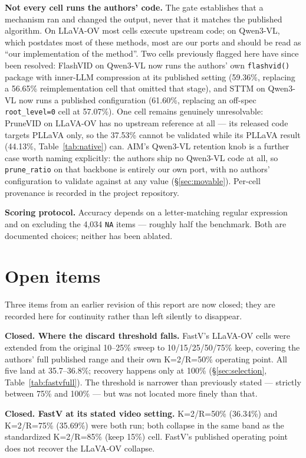 \documentclass[11pt]{article}
\begin{document}
\textbf{Not every cell runs the authors' code.} The gate establishes that a
mechanism ran and changed the output, never that it matches the published
algorithm. On LLaVA-OV most cells execute upstream code; on Qwen3-VL, which
postdates most of these methods, most are our ports and should be read as
``our implementation of the method''. Two cells previously flagged here have
since been resolved: FlashVID on Qwen3-VL now runs the authors' own
\texttt{flashvid()} package with inner-LLM compression at its published
setting (59.36\%, replacing a 56.65\% reimplementation cell that omitted
that stage), and STTM on Qwen3-VL now runs a published configuration
(61.60\%, replacing an off-spec \texttt{root\_level=0} cell at 57.07\%). One
cell remains genuinely unresolvable: PruneVID on LLaVA-OV has no upstream
reference at all --- its released code targets PLLaVA only, so the 37.53\%
cannot be validated while its PLLaVA result (44.13\%, Table~\ref{tab:native})
can. AIM's Qwen3-VL retention knob is a further case worth naming
explicitly: the authors ship no Qwen3-VL code at all, so \texttt{prune\_ratio}
on that backbone is entirely our own port, with no authors' configuration to
validate against at any value (\S\ref{sec:movable}). Per-cell provenance is
recorded in the project repository.

\textbf{Scoring protocol.} Accuracy depends on a letter-matching regular
expression and on excluding the 4{,}034 \texttt{NA} items --- roughly half
the benchmark. Both are documented choices; neither has been ablated.

\section{Open items}
\label{app:open}

Three items from an earlier revision of this report are now closed; they are
recorded here for continuity rather than left silently to disappear.

\textbf{Closed. Where the discard threshold falls.} FastV's LLaVA-OV cells
were extended from the original 10--25\% sweep to 10/15/25/50/75\% keep,
covering the authors' full published range and their own K=2/R=50\%
operating point. All five land at 35.7--36.8\%; recovery happens only at
100\% (\S\ref{sec:selection}, Table~\ref{tab:fastvfull}). The threshold is
narrower than previously stated --- strictly between 75\% and 100\% --- but
was not located more finely than that.

\textbf{Closed. FastV at its stated video setting.} K=2/R=50\% (36.34\%) and
K=2/R=75\% (35.69\%) were both run; both collapse in the same band as the
standardized K=2/R=85\% (keep 15\%) cell. FastV's published operating point
does not recover the LLaVA-OV collapse.
\end{document}
